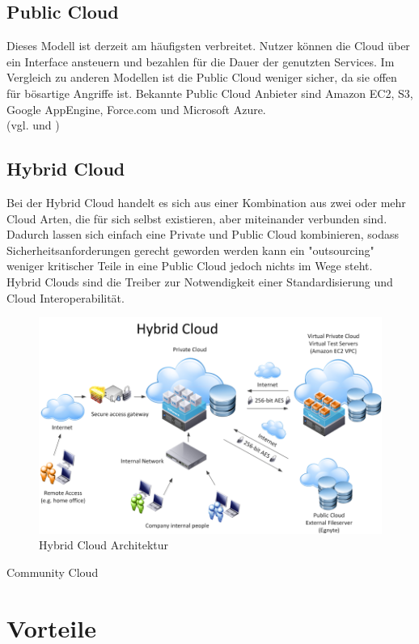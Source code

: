 \subsection{Public Cloud}
Dieses Modell ist derzeit am häufigsten verbreitet. Nutzer können die Cloud über ein Interface ansteuern und bezahlen für die Dauer der genutzten Services. Im Vergleich zu anderen Modellen ist die Public Cloud weniger sicher, da sie offen für bösartige Angriffe ist. Bekannte Public Cloud Anbieter sind Amazon EC2, S3, Google AppEngine, Force.com und Microsoft Azure. \\
(vgl. \cite{Jadeja.2012} und \cite{Tharam.2010})
	
\subsection{Hybrid Cloud}
Bei der Hybrid Cloud handelt es sich aus einer Kombination aus zwei oder mehr Cloud Arten, die für sich selbst existieren, aber miteinander verbunden sind. Dadurch lassen sich einfach eine Private und Public Cloud kombinieren, sodass Sicherheitsanforderungen gerecht geworden werden kann ein "outsourcing" weniger kritischer Teile in eine Public Cloud jedoch nichts im Wege steht.\\
Hybrid Clouds sind die Treiber zur Notwendigkeit einer Standardisierung und Cloud Interoperabilität.

	\begin{figure}[h]
		\centering
		\includegraphics[width=0.9\linewidth]{images/hybrid-cloud-architektur}
		\caption{Hybrid Cloud Architektur}
		\label{fig:HybridCloud}
	\end{figure}


Community Cloud\\

\section{Vorteile}
